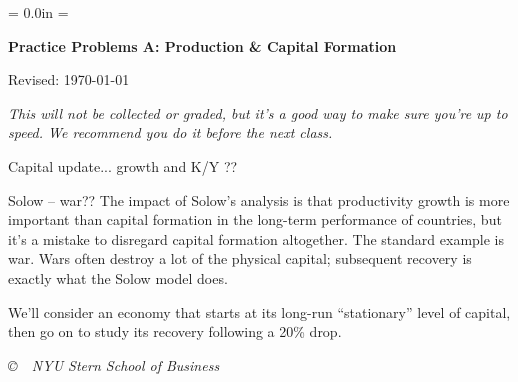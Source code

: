 \documentclass[12pt]{exam}
\def\HeadName{Practice Problems A}
\begin{document}
\parindent = 0.0in
\parskip = \bigskipamount
\thispagestyle{empty}%
\Head

\centerline{\large \bf \HeadName: Production \& Capital Formation}
\centerline{Revised:  \today}

\medskip
{\it This will not be collected or graded, but it's a good way to make sure you're up to speed.
We recommend you do it before the next class.}

\begin{questions}
\question Capital update...  growth and K/Y ?? 

\question Solow -- war??  
The impact of Solow's analysis is that productivity growth 
is more important than capital formation in the long-term 
performance of countries, 
but it's a mistake to disregard capital formation altogether.  
The standard example is war.
Wars often destroy a lot of the physical capital;
subsequent recovery is exactly what the Solow model does.  

We'll consider an economy that starts at its long-run 
``stationary'' level of capital, then go on
to study its recovery following a 20\% drop.  
%

\end{questions}

\vfill \centerline{\it \copyright \ \number\year \
NYU Stern School of Business}
\end{document}
